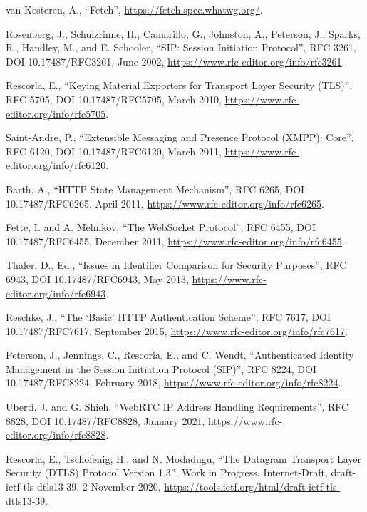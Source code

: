 \documentclass{article}
\begin{document}
\begin{description}[style=nextline, leftmargin=2cm, labelwidth=1.8cm]

\item[{[fetch]}] van Kesteren, A., ``Fetch'',
  \url{https://fetch.spec.whatwg.org/}.

\item[{[RFC3261]}] Rosenberg, J., Schulzrinne, H., Camarillo, G., Johnston,
  A., Peterson, J., Sparks, R., Handley, M., and E.
  Schooler, ``SIP: Session Initiation Protocol'', RFC 3261,
  DOI 10.17487/RFC3261, June 2002,
  \url{https://www.rfc-editor.org/info/rfc3261}.

\item[{[RFC5705]}] Rescorla, E., ``Keying Material Exporters for Transport
  Layer Security (TLS)'', RFC 5705, DOI 10.17487/RFC5705,
  March 2010, \url{https://www.rfc-editor.org/info/rfc5705}.

\item[{[RFC6120]}] Saint-Andre, P., ``Extensible Messaging and Presence
  Protocol (XMPP): Core'', RFC 6120, DOI 10.17487/RFC6120,
  March 2011, \url{https://www.rfc-editor.org/info/rfc6120}.

\item[{[RFC6265]}] Barth, A., ``HTTP State Management Mechanism'', RFC 6265,
  DOI 10.17487/RFC6265, April 2011,
  \url{https://www.rfc-editor.org/info/rfc6265}.

\item[{[RFC6455]}] Fette, I. and A. Melnikov, ``The WebSocket Protocol'',
  RFC 6455, DOI 10.17487/RFC6455, December 2011,
  \url{https://www.rfc-editor.org/info/rfc6455}.

\item[{[RFC6943]}] Thaler, D., Ed., ``Issues in Identifier Comparison for
  Security Purposes'', RFC 6943, DOI 10.17487/RFC6943, May
  2013, \url{https://www.rfc-editor.org/info/rfc6943}.

\item[{[RFC7617]}] Reschke, J., ``The `Basic' HTTP Authentication Scheme'',
  RFC 7617, DOI 10.17487/RFC7617, September 2015,
  \url{https://www.rfc-editor.org/info/rfc7617}.

\item[{[RFC8224]}] Peterson, J., Jennings, C., Rescorla, E., and C. Wendt,
  ``Authenticated Identity Management in the Session
  Initiation Protocol (SIP)'', RFC 8224,
  DOI 10.17487/RFC8224, February 2018,
  \url{https://www.rfc-editor.org/info/rfc8224}.

\item[{[RFC8828]}] Uberti, J. and G. Shieh, ``WebRTC IP Address Handling
  Requirements'', RFC 8828, DOI 10.17487/RFC8828, January
  2021, \url{https://www.rfc-editor.org/info/rfc8828}.

\item[{[TLS-DTLS13]}] Rescorla, E., Tschofenig, H., and N. Modadugu, ``The
  Datagram Transport Layer Security (DTLS) Protocol Version
  1.3'', Work in Progress, Internet-Draft, draft-ietf-tls-dtls13-39, 2 November 2020,
  \url{https://tools.ietf.org/html/draft-ietf-tls-dtls13-39}.

\end{description}
\end{document}
